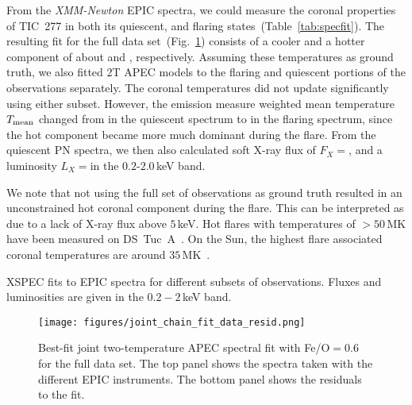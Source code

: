 \documentclass[twocolumn]{aastex631}
\begin{document}
From the \textit{XMM-Newton} EPIC spectra, we could measure the coronal properties of TIC~277 in both its quiescent, and flaring states~(Table~\ref{tab:specfit}). The resulting fit for the full data set~(Fig.~\ref{fig:spec_joint_all}) consists of a cooler and a hotter component of about \Tcool and \Thot\hspace{-1.cm}, respectively. Assuming these temperatures as ground truth, we also fitted 2T APEC models to the flaring and quiescent portions of the observations separately. The coronal temperatures did not update significantly using either subset. However, the emission measure weighted mean temperature $T_{\rm mean}$ changed from \Tqmean in the quiescent spectrum to \Tfmean in the flaring spectrum, since the hot component became more much dominant during the flare. From the quiescent PN spectra, we then also calculated soft X-ray flux of $F_X=$\FX, and a luminosity $L_X=$\LXquiet in the $0.2$-$2.0\,$keV band. %

We note that not using the full set of observations as ground truth resulted in an unconstrained hot coronal component during the flare. This can be interpreted as due to a lack of X-ray flux above $5\,$keV. Hot flares with temperatures of $>50\,$MK have been measured on DS~Tuc~A~\citep{pillitteri2011xray}. On the Sun, the highest flare associated coronal temperatures are around $35\,$MK~\citep{kay2003soft}.


 \begin{table}
\footnotesize
\centering
    \caption{XSPEC fits to EPIC spectra for different subsets of observations. Fluxes and luminosities are given in the $0.2-2\,$keV band.}
    
        \label{tab:specfit}
\end{table}


\begin{figure}
    \begin{centering}
        \texttt{[image: figures/joint\_chain\_fit\_data\_resid.png]}
        \caption{
         Best-fit joint two-temperature APEC spectral fit with Fe/O$=0.6$ for the full data set. The top panel shows the spectra taken with the different EPIC instruments. The bottom panel shows the residuals to the fit.
        }
        \label{fig:spec_joint_all}
    \end{centering}
\end{figure}
\end{document}

